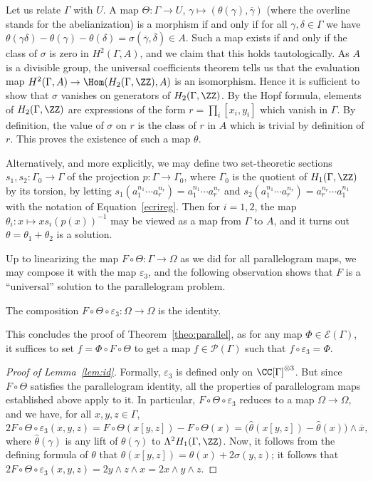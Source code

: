 Let us relate $\Gamma$ with $U$. A map $\Theta\colon\Gamma\to U$,
$\gamma\mapsto(\theta(\gamma),\overline{\gamma})$ (where the overline stands
for the abelianization) is a morphism if and only if for all
$\gamma,\delta\in\Gamma$ we have
$\theta(\gamma\delta)-\theta(\gamma)-\theta(\delta)=
\sigma(\overline{\gamma},\overline{\delta})\in A$.
Such a map exists if and only if the class of $\sigma$ is zero in
$H^2(\Gamma,A)$, and we claim that this holds tautologically.
As $A$ is a divisible group, the universal coefficients theorem tells
us that the evaluation map $H^2(\Gamma,A)\to\Hom(H_2(\Gamma,\ZZ),A)$
is an isomorphism. Hence it is sufficient to show that $\sigma$ vanishes on
generators of $H_2(\Gamma,\ZZ)$. By the Hopf formula, elements of
$H_2(\Gamma,\ZZ)$ are expressions of the form $r=\prod_i[x_i,y_i]$ which
vanish in $\Gamma$. By definition, the value of $\sigma$ on $r$ is the class
of $r$ in $A$ which is trivial by definition of $r$.
This proves the existence of such a map $\theta$.

Alternatively, and more explicitly, we may define two set-theoretic sections
$s_1,s_2\colon \Gamma_0\to\Gamma$ of the projection
$p\colon \Gamma\to\Gamma_0$, where $\Gamma_0$ is the quotient of
$H_1(\Gamma,\ZZ)$ by its torsion, by letting
$s_1(a_1^{n_1}\cdots a_r^{n_r})=a_1^{n_1}\cdots a_r^{n_r}$
and $s_2(a_1^{n_1}\cdots a_r^{n_r})=a_r^{n_r}\cdots a_1^{n_1}$ with
the notation of Equation~\eqref{ecrireg}. Then for $i=1,2$,
the map $\theta_i\colon x\mapsto x s_i(p(x))^{-1}$ may be viewed as a
map from $\Gamma$ to $A$, and it turns out $\theta=\theta_1+\theta_2$
is a solution.

Up to linearizing the map $F\circ\Theta\colon\Gamma\to\Omega$ as we did for
all parallelogram maps, we may compose it with the map $\varepsilon_3$, and
the following observation shows that $F$ is a ``universal'' solution
to the parallelogram problem.
\begin{lemma}\label{lem:id}
The composition $F\circ\Theta\circ\varepsilon_3\colon\Omega\to\Omega$
is the identity.
\end{lemma}
This concludes the proof of Theorem~\ref{theo:parallel}, as for any map
$\Phi\in\mathcal{E}(\Gamma)$, it suffices to set $f=\Phi\circ F\circ\Theta$
to get a map $f\in\mathcal{P}(\Gamma)$ such that $f\circ\varepsilon_3=\Phi$.
\begin{proof}[Proof of Lemma~\ref{lem:id}]
Formally, $\varepsilon_3$ is defined only on $\CC[\Gamma]^{\otimes 3}$.
But since $F\circ\Theta$ satisfies the parallelogram identity,
all the properties of parallelogram maps established above apply
to it. In particular, $F\circ\Theta\circ\varepsilon_3$ reduces to
a map $\Omega\to\Omega$, and we have, for all $x,y,z\in\Gamma$,
\[
2F\circ\Theta\circ\varepsilon_3(x,y,z)=
F\circ\Theta(x[y,z])-F\circ\Theta(x) =
\bigl(\widehat{\theta}(x[y,z])-\widehat{\theta}(x)\bigr)\wedge\overline{x},
\]
where $\widehat{\theta}(\gamma)$ is any lift of $\theta(\gamma)$ to
$\Lambda^2H_1(\Gamma,\ZZ)$.
Now, it follows from the defining formula of $\theta$ that
$\theta(x[y,z])=\theta(x)+2\sigma(y,z)$; it follows that
$2F\circ\Theta\circ\varepsilon_3(x,y,z)=
2y\wedge z\wedge x=2x\wedge y\wedge z$.
\end{proof}

